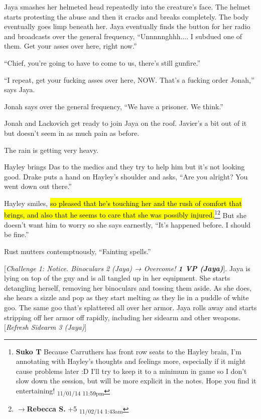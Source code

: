 Jaya smashes her helmeted head repeatedly into the creature's face.  The helmet starts protesting the abuse and then it cracks and breaks completely. The body eventually goes limp beneath her.  Jaya eventually finds the button for her radio and broadcasts over the general frequency, ``Unnnnnghhh.... I subdued one of them.  Get your asses over here, right now.''

``Chief, you're going to have to come to us, there's still gunfire.''

``I repeat, get your fucking asses over here, NOW.  That's a fucking order Jonah,'' says Jaya.

Jonah says over the general frequency, ``We have a prisoner.  We think.''

Jonah and Lackovich get ready to join Jaya on the roof.  Javier's a bit out of it but doesn't seem in as much pain as before.

The rain is getting very heavy.



Hayley brings Das to the medics and they try to help him but it's not looking good.  Drake puts a hand on Hayley's shoulder and asks, ``Are you alright?  You went down out there.''

Hayley smiles, \hl{so pleased that he's touching her and the rush of comfort that brings, and also that he seems to care that she was possibly injured.}\footnote{\textbf{Suko T }Because Carruthers has front row seats to the Hayley brain, I'm annotating with Hayley's thoughts and feelings more, especially if it might cause problems later :D  I'll try to keep it to a minimum in game so I don't slow down the session, but will be more explicit in the notes.  Hope you find it entertaining! \textsubscript{11/01/14 11:59pm}}\footnote{$\rightarrow$\textbf{Rebecca S. }+5 \textsubscript{11/02/14 1:43am}} But she doesn't want him to worry so she says earnestly, ``It's happened before.  I should be fine.''

Rust mutters contemptuously, ``Fainting spells.''



{[}\textit{Challenge 1: Notice.  Binoculars 2 (Jaya) → Overcome! }\textit{\textbf{1 VP (Jaya)}}{]}.  Jaya is lying on top of the guy and is all tangled up in her equipment.  She starts detangling herself, removing her binoculars and tossing them aside.  As she does, she hears a sizzle and pop as they start melting as they lie in a puddle of white goo.  The same goo that's splattered all over her armor.  Jaya rolls away and starts stripping off her armor off rapidly, including her sidearm and other weapons.   {[}\textit{Refresh Sidearm 3 (Jaya)}{]}


